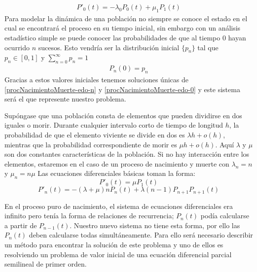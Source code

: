 \begin{eqnarray}
    P'_0(t)=-\lambda_0 P_0(t)+\mu_{1}P_{1}(t)
\label{procNacimientoMuerte-edo-0}
\end{eqnarray}
Para modelar la dinámica de una población no siempre se conoce el estado en el cual se encontrará el proceso en su tiempo inicial, sin embargo con un análisis estadístico simple se puede conocer las probabilidades de que al tiempo $0$ hayan ocurrido $n$ sucesos. Esto vendría ser la distribución inicial $\{p_n\}$ tal que $p_n\in [0,1]$ y $\sum_{n=0}^\infty p_n =1$
\begin{eqnarray}
    P_n(0)=p_n
\end{eqnarray}
Gracias a estos valores iniciales tenemos soluciones únicas de \ref{procNacimientoMuerte-edo-n} y \ref{procNacimientoMuerte-edo-0} y este sistema será el que represente nuestro problema.\\
\begin{Ejm}
Supóngase que una población consta de elementos que pueden dividirse en dos iguales o morir. Durante cualquier intervalo corto de tiempo de longitud $h$, la probabilidad de que el elemento viviente se divide en dos es $\lambda h+ o(h)$, mientras que la probabilidad correspondiente de morir es $\mu h + o(h)$. Aquí $\lambda$ y $\mu$ son dos constantes características de la población. Si no hay interacción entre los elementos, estaremos en el caso de un proceso de nacimiento y muerte con $\lambda_n=n$ y $\mu_n =n \mu$
Las ecuaciones diferenciales básicas toman la forma:
$$P'_0(t)=\mu P_1(t)$$
$$P'_n(t)=-(\lambda+\mu)n P_n(t)+\lambda(n-1)P_{n+1}P_{n+1}(t)$$
\end{Ejm}
En el proceso puro de nacimiento, el sistema de ecuaciones diferenciales era infinito pero tenía la forma de relaciones de recurrencia; $P_n(t)$ podía calcularse a partir de $P_{n-1}(t)$. Nuestro nuevo sistema no tiene esta forma, por ello las $P_n(t)$ deben calcularse todas simultáneamente. Para ello será necesario describir un método para encontrar la solución de este problema y uno de ellos es resolviendo un problema de valor inicial de una ecuación diferencial parcial semilineal de primer orden.
